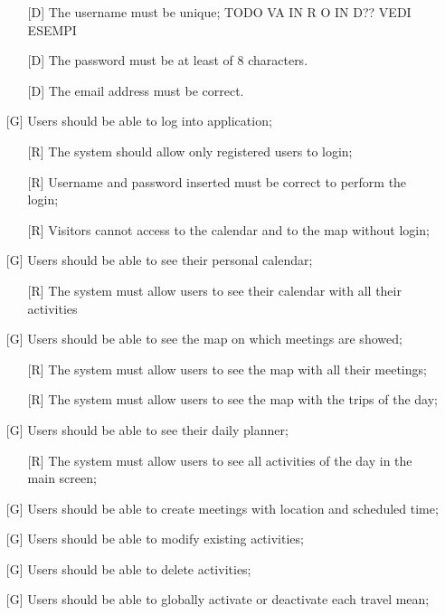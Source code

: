 \documentclass[12pt,titlepage]{article}
\begin{document}
\begin{itemize}
\begin{itemize}
\item[{[D\ped{1}]}] The username must be unique; TODO VA IN R O IN D?? VEDI ESEMPI 
\item[{[D\ped{2}]}] The password must be at least of 8 characters.
\item[{[D\ped{3}]}] The email address must be correct.
\end{itemize}
\item [{[G\ped{2}]}]		Users should be able to log into application;
\begin{itemize}
\item[{[R\ped{1}]}] The system should allow only registered users to login;
\item[{[R\ped{2}]}] Username and password inserted must be correct to perform the login;
\item[{[R\ped{3}]}] Visitors cannot access to the calendar and to the map without login;
\end{itemize}
\item [{[G\ped{3}]}]		Users should be able to see their personal calendar;
\begin{itemize}
\item[{[R\ped{1}]}] The system must allow users to see their calendar with all their activities
\end{itemize}
\item [{[G\ped{4}]}]		Users should be able to see the map on which meetings are showed;
\begin{itemize} 
\item[{[R\ped{1}]}] The system must allow users to see the map with all their meetings; 
\item[{[R\ped{1}]}] The system must allow users to see the map with the trips of the day; 
\end{itemize} 
\item [{[G\ped{5}]}]		Users should be able to see their daily planner;
\begin{itemize} 
\item[{[R\ped{1}]}] The system must allow users to see all activities of the day in the main screen; 
\end{itemize} 
\item [{[G\ped{6}]}]		Users should be able to create meetings with location and scheduled time;
\item [{[G\ped{7}]}]		Users should be able to modify existing activities;
\item [{[G\ped{8}]}]		Users should be able to delete activities;
\item [{[G\ped{9}]}]		Users should be able to globally activate or deactivate each travel mean;

\end{itemize}
\end{document}
